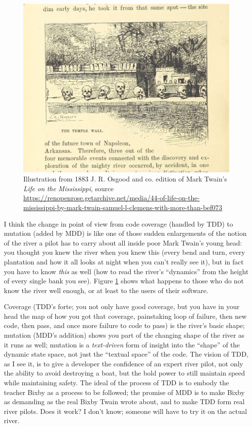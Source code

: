 \documentclass[sigplan,screen]{acmart}
\begin{document}
\begin{figure}
  \includegraphics[width=\columnwidth]{twain.jpg}
  \caption{Illustration from 1883 J. R. Osgood and co. edition of Mark
  Twain's \emph{Life on the Mississippi}, source \url{https://renopenrose.getarchive.net/media/44-of-life-on-the-mississippi-by-mark-twain-samuel-l-clemens-with-more-than-bef073}}
  \label{fig:twain}
  \end{figure}

I think the change in point of view from code coverage (handled by
TDD) to mutation (added by MDD) is like one of those sudden
enlargements of the notion of the river a pilot has to carry about all
inside poor Mark Twain's young head:  you thought you knew the river
when you knew this (every bend and turn, every plantation and how it
all looks at night when you can't really see it), but in fact you have
to know \emph{this} as well (how to read the river's ``dynamics'' from
the height of every single bank you see).  Figure \ref{fig:twain}
shows what happens to those who do not know the river well enough, or
at least to the users of their software.

Coverage (TDD's forte; you not only have good coverage, but you have
in your head the map of how you got that coverage, painstaking loop of
failure, then new code, then pass, and once more failure to code to pass) is the river's basic
shape; mutation (MDD's addition) shows you part of the changing shape
of the river as it runs as well; mutation is a \emph{text-driven} form
of insight into the ``shape'' of the dynamic state space, not just the
``textual space'' of the code.  The vision of TDD, as I see it, is to
give a developer the confidence of an expert river pilot, not only the
ability to avoid destroying a boat, but the bold power to still
maintain speed while maintaining safety.  The ideal of the process of
TDD is to embody the teacher Bixby as a process to be followed; the
promise of MDD is to make Bixby as demanding as the real Bixby Twain
wrote about, and to make TDD form real river pilots.  Does it work?  I
don't know; someone will have to try it on the actual river.
\end{document}
